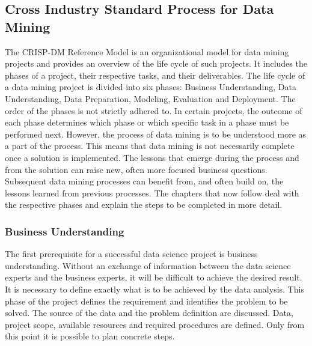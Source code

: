 \subsection{Cross Industry Standard Process for Data Mining}

The CRISP-DM Reference Model is an organizational model for data mining projects and provides an overview of the life cycle of such projects. 
It includes the phases of a project, their respective tasks, and their deliverables. 
The life cycle of a data mining project is divided into six phases: Business Understanding, Data Understanding, Data Preparation, Modeling, Evaluation and Deployment. 
The order of the phases is not strictly adhered to. In certain projects, the outcome of each phase determines which phase or which specific task in a phase must be performed next. 
However, the process of data mining is to be understood more as a part of the process. This means that data mining is not necessarily complete once a solution is implemented. 
The lessons that emerge during the process and from the solution can raise new, often more focused business questions. 
Subsequent data mining processes can benefit from, and often build on, the lessons learned from previous processes. 
The chapters that now follow deal with the respective phases and explain the steps to be completed in more detail.

\subsubsection{Business Understanding}
The first prerequisite for a successful data science project is business understanding. 
Without an exchange of information between the data science experts and the business experts, it will be difficult to achieve the desired result. 
It is necessary to define exactly what is to be achieved by the data analysis. This phase of the project defines the requirement and identifies the problem to be solved. 
The source of the data and the problem definition are discussed. Data, project scope, available resources and required procedures are defined. 
Only from this point it is possible to plan concrete steps.


